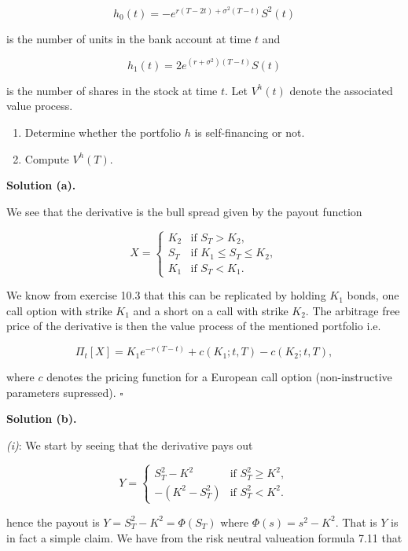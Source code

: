 \documentclass[
]{book}
\providecommand{\tightlist}{%
  \setlength{\itemsep}{0pt}\setlength{\parskip}{0pt}}
\begin{document}
\[
h_0(t)=-e^{r(T-2t)+\sigma^2(T-t)}S^2(t)
\]

is the number of units in the bank account at time \(t\) and

\[
h_1(t)=2e^{(r+\sigma^2)(T-t)}S(t)
\]

is the number of shares in the stock at time \(t\). Let \(V^h(t)\) denote the associated value process.

\begin{enumerate}
\def\labelenumi{\alph{enumi}.}
\setcounter{enumi}{2}
\tightlist
\item
  Determine whether the portfolio \(h\) is self-financing or not.
\item
  Compute \(V^h(T)\).
\end{enumerate}

\textbf{Solution (a).}

We see that the derivative is the bull spread given by the payout function

\[
X=
\begin{cases}
  K_2 & \text{if }S_T>K_2,\\
  S_T & \text{if }K_1\le S_T\le K_2,\\
  K_1 &\text{if }S_T< K_1.
\end{cases}
\]

We know from exercise 10.3 that this can be replicated by holding \(K_1\) bonds, one call option with strike \(K_1\) and a short on a call with strike \(K_2\). The arbitrage free price of the derivative is then the value process of the mentioned portfolio i.e.

\[
\Pi_t[X]=K_1 e^{-r(T-t)}+c(K_1;t,T)-c(K_2;t,T),
\]

where \(c\) denotes the pricing function for a European call option (non-instructive parameters supressed). \(\square\)

\noindent\makebox[\linewidth]{\rule{\textwidth}{0.4pt}}

\textbf{Solution (b).}

\emph{(i)}: We start by seeing that the derivative pays out

\[
Y=
\begin{cases}
  S_T^2-K^2 & \text{if }S_T^2\ge K^2,\\
  -(K^2-S_T^2) &\text{if }S_T^2< K^2.
\end{cases}
\]

hence the payout is \(Y=S_T^2-K^2=\Phi(S_T)\) where \(\Phi(s)=s^2-K^2\). That is \(Y\) is in fact a simple claim. We have from the risk neutral valueation formula 7.11 that
\end{document}
